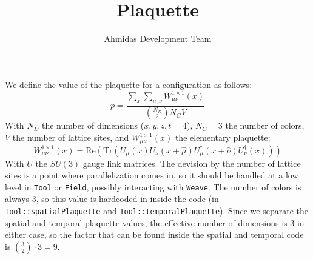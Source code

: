 \documentclass[a4paper,12pt,twoside]{article}
\author{Ahmidas Development Team}
\title{Plaquette}
\begin{document}
\maketitle

We define the value of the plaquette for a configuration as follows:
\begin{equation}
  p=\frac{\sum_{x}\sum_{\mu,\nu}W_{\mu\nu}^{1\times 1}(x)}{\binom{N_{D}}{2}N_{C}V} 
\end{equation}
With $N_{D}$ the number of dimensions (${x,y,z,t}=4$), $N_{C}=3$ the number of colors, $V$ the number of lattice sites, and $W_{\mu\nu}^{1\times 1}(x)$ the elementary \mbox{plaquette}:
\begin{equation}
W_{\mu\nu}^{1\times 1}(x) = \mathrm{Re}\left(\mathrm{Tr}\left(U_{\mu}(x)U_{\nu}(x +\hat{\mu})U^{\dagger}_{\mu}(x + \hat{\nu})U^{\dagger}_{\nu}(x)\right)\right)
\end{equation}
With $U$ the $SU(3)$ gauge link matrices. The devision by the number of lattice sites is a point where parallelization comes in, so it should be handled at a low level in \verb|Tool| or \verb|Field|, possibly interacting with \verb|Weave|. The number of colors is always $3$, so this value is hardcoded in inside the code (in \verb|Tool::spatialPlaquette| and \verb|Tool::temporalPlaquette|). Since we separate the spatial and temporal plaquette values, the effective number of dimensions is 3 in either case, so the factor that can be found inside the spatial and temporal code is $\binom{3}{2}\cdot 3 = 9$.
\end{document}
